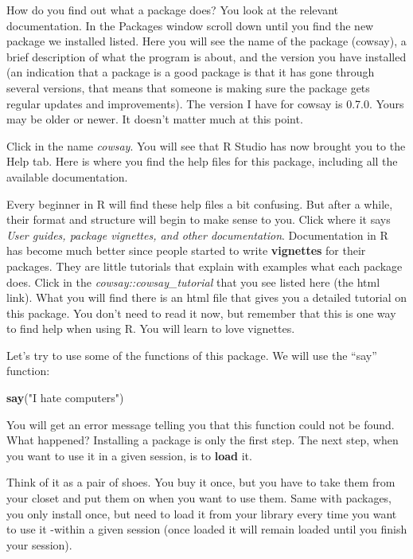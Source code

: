\documentclass[]{book}
\newenvironment{Shaded}{\begin{snugshade}}{\end{snugshade}}
\newcommand{\KeywordTok}[1]{\textcolor[rgb]{0.13,0.29,0.53}{\textbf{#1}}}
\newcommand{\NormalTok}[1]{#1}
\newcommand{\StringTok}[1]{\textcolor[rgb]{0.31,0.60,0.02}{#1}}
\begin{document}
How do you find out what a package does? You look at the relevant documentation. In the Packages window scroll down until you find the new package we installed listed. Here you will see the name of the package (cowsay), a brief description of what the program is about, and the version you have installed (an indication that a package is a good package is that it has gone through several versions, that means that someone is making sure the package gets regular updates and improvements). The version I have for cowsay is 0.7.0. Yours may be older or newer. It doesn't matter much at this point.

Click in the name \emph{cowsay}. You will see that R Studio has now brought you to the Help tab. Here is where you find the help files for this package, including all the available documentation.

Every beginner in R will find these help files a bit confusing. But after a while, their format and structure will begin to make sense to you. Click where it says \emph{User guides, package vignettes, and other documentation}. Documentation in R has become much better since people started to write \textbf{vignettes} for their packages. They are little tutorials that explain with examples what each package does. Click in the \emph{cowsay::cowsay\_tutorial} that you see listed here (the html link). What you will find there is an html file that gives you a detailed tutorial on this package. You don't need to read it now, but remember that this is one way to find help when using R. You will learn to love vignettes.

Let's try to use some of the functions of this package. We will use the ``say'' function:

\begin{Shaded}
\begin{Highlighting}[]
\KeywordTok{say}\NormalTok{(}\StringTok{"I hate computers"}\NormalTok{)}
\end{Highlighting}
\end{Shaded}

You will get an error message telling you that this function could not be found. What happened? Installing a package is only the first step. The next step, when you want to use it in a given session, is to \textbf{load} it.

Think of it as a pair of shoes. You buy it once, but you have to take them from your closet and put them on when you want to use them. Same with packages, you only install once, but need to load it from your library every time you want to use it -within a given session (once loaded it will remain loaded until you finish your session).
\end{document}
